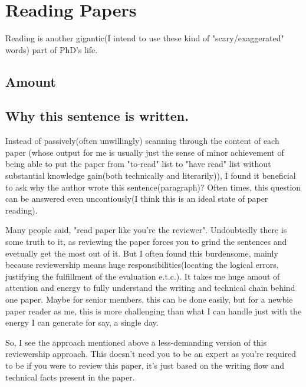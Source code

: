 \section{Reading Papers}
\label{sec:read}
Reading is another gigantic(I intend to use these kind of "scary/exaggerated" words) part of PhD's life.
\subsection{Amount}
\subsection{Why this sentence is written.}
Instead of passively(often unwillingly) scanning through the content of each paper (whose output for me is usually just the 
sense of minor achievement of being able to put the paper from "to-read" list to "have read" list without substantial knowledge gain(both technically and literarily)),
I found it beneficial to ask why the author wrote this sentence(paragraph)? 
Often times, this question can be answered even uncontiously(I think this is an ideal state of paper reading).

Many people said, "read paper like you're the reviewer". Undoubtedly there is some truth to it, as reviewing the paper forces you to grind the sentences and 
evetually get the most out of it.
But I often found this burdensome, mainly because reviewership %
means huge responsibilities(locating the logical errors, justifying the fulfillment of the evaluation e.t.c.).
It takes me huge amout of attention and energy to fully understand the writing and technical chain behind one paper.
Maybe for senior members, this can be done easily, but for a newbie paper reader as me, 
this is more challenging than what I can handle just with the energy I can generate for say, a single day.

So, I see the approach mentioned above a less-demanding version of this reviewership approach.
This doesn't need you to be an expert as you're required to be if you were to review this paper,
it's just based on the writing flow and technical facts present in the paper.